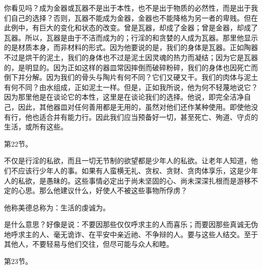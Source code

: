 你看见吗？成为金器或瓦器不是出于本性，也不是出于物质的必然性，而是出于我们自己的选择？否则，瓦器不能成为金器，金器也不能降格为另一者的卑贱。但在此例中，有巨大的变化和状态的改变。曾是瓦器，却成了金器；曾是金器，却成了瓦器。所以，瓦器是由于不洁而成为的；行淫的和贪婪的人成为瓦器。那里他显示的是材质本身，而非材料的形式。因为他要说的是，我们的身体是瓦器。正如陶器不过是烘干的泥土，我们的身体也不过是泥土因灵魂的热力而凝结；因为它是瓦器的，是明显的。因为正如这样的器皿常因摔倒而破碎粉碎，我们的身体也因死亡而倒下并分解。因为我们的骨头与陶片有何不同？它们又硬又干。我们的肉体与泥土有何不同？由水组成，正如泥土一样。但是，正如我所说，他为何不轻蔑地说它？因为那里他是在谈论它的本性，这里是在谈论我们的选择。他说，即完全洁净自己，因此，其他器皿对任何善用都是无用的，虽然对他们还作某种使用。即使他没有行，他也适合并有能力行。因此我们应当预备好一切，甚至死亡、殉道、守贞的生活，或所有这些。\par

第22节。\par

不仅是行淫的私欲，而且一切无节制的欲望都是少年人的私欲。让老年人知道，他们不应该行少年人的事。如果有人蛮横无礼、贪权、贪财、贪肉体享乐，这是少年人的私欲，是愚昧的。这些事情必定出于尚未坚固的心、尚未深深扎根而是游移不定的心思。那么他建议什么，好使人不被这些事物所俘虏？\par

\par

他称美德总称为：生活的虔诚为。\par

是什么意思？好像是说：不要因那些仅仅呼求主的人而喜乐；而要因那些真诚无伪地呼求主的人、毫无诡诈、在平安中亲近祂、不争辩的人。要与这些人结交。至于其他人，不要轻易与他们交往，但尽可能与众人和睦。\par

第23节。\par

